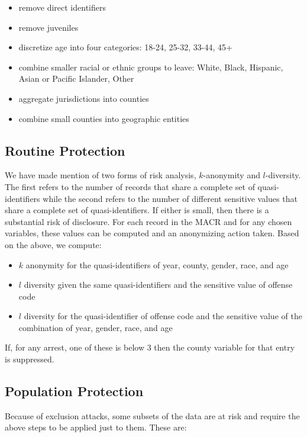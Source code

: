 \documentclass[]{article}
\providecommand{\tightlist}{%
  \setlength{\itemsep}{0pt}\setlength{\parskip}{0pt}}
\begin{document}
\begin{itemize}
\tightlist
\item
  remove direct identifiers
\item
  remove juveniles
\item
  discretize age into four categories: 18-24, 25-32, 33-44, 45+
\item
  combine smaller racial or ethnic groups to leave: White, Black,
  Hispanic, Asian or Pacific Islander, Other
\item
  aggregate jurisdictions into counties
\item
  combine small counties into geographic entities
\end{itemize}

\subsection{Routine Protection}\label{routine-protection}

We have made mention of two forms of risk analysis, \(k\)-anonymity and
\(l\)-diversity. The first refers to the number of records that share a
complete set of quasi-identifiers while the second refers to the number
of different sensitive values that share a complete set of
quasi-identifiers. If either is small, then there is a substantial risk
of disclosure. For each record in the MACR and for any chosen variables,
these values can be computed and an anonymizing action taken. Based on
the above, we compute:

\begin{itemize}
\tightlist
\item
  \(k\) anonymity for the quasi-identifiers of year, county, gender,
  race, and age
\item
  \(l\) diversity given the same quasi-identifiers and the sensitive
  value of offense code
\item
  \(l\) diversity for the quasi-identifier of offense code and the
  sensitive value of the combination of year, gender, race, and age
\end{itemize}

If, for any arrest, one of these is below 3 then the county variable for
that entry is suppressed.

\subsection{Population Protection}\label{population-protection}

Because of exclusion attacks, some subsets of the data are at risk and
require the above steps to be applied just to them. These are:
\end{document}
